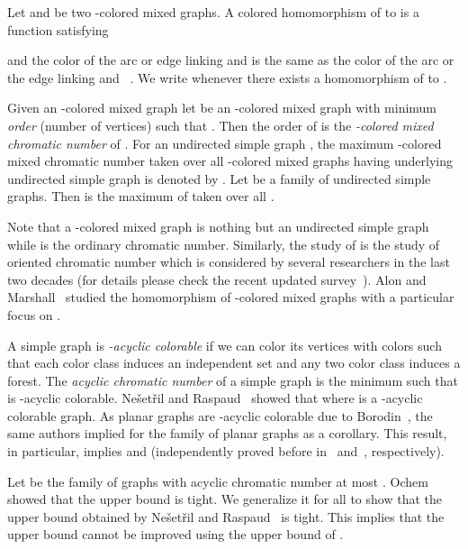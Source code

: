 \documentclass[11pt]{article}
\begin{document}
  
Let  and 
be two -colored mixed graphs. 
A colored homomorphism of  to  is a function  satisfying
 

and the color of the arc or  edge linking  and  is the same as the color of the arc or the edge linking  and ~\cite{raspaud_and_nesetril}.
  We write  whenever there exists a 
 homomorphism of  to .


Given an -colored mixed graph  let  be an -colored mixed graph with minimum \textit{order} (number of vertices) such that . 
Then the order of  is the \textit{-colored mixed chromatic number}  of .
For an undirected simple graph , the maximum -colored mixed chromatic number taken over all -colored mixed
graphs having underlying undirected simple graph  is denoted by  .
Let  be a family of undirected simple graphs. 
Then   is the maximum of  
taken over all .




Note that a -colored mixed graph   is nothing but an undirected simple graph while  
 is the ordinary chromatic number. 
Similarly, the study of  
is  the study of oriented chromatic number which is considered by several researchers in the last two decades (for details please check the recent updated survey~\cite{sopena_updated_survey}).
Alon and Marshall~\cite{Marshall-edgecoloring}  studied the homomorphism of -colored mixed graphs with a particular focus on . 

A simple graph  is \textit{-acyclic colorable} if we can color its vertices with  colors such that each color class induces an independent set and any two color class induces a forest. 
The \textit{acyclic chromatic number}  of a simple graph  is the minimum   
such that  is -acyclic colorable. 
Ne\v{s}et\v{r}il and Raspaud~\cite{raspaud_and_nesetril} showed that  where  is a -acyclic colorable graph. 
As planar graphs are -acyclic colorable due to Borodin~\cite{Borodinacyclic}, the same authors implied 
  for the family  of planar graphs as a corollary.
This result, in particular, implies  and  (independently proved 
before in~\cite{planar80} and~\cite{Marshall-edgecoloring}, respectively). 


 Let  be the family of graphs with acyclic chromatic number at most . Ochem~\cite{Ochem_negativeresults} showed that the upper bound     is tight.  
We generalize it for all  to show that the upper bound 
 obtained by Ne\v{s}et\v{r}il and Raspaud~\cite{raspaud_and_nesetril}
is tight. 
This implies that the upper bound  cannot be improved using
the upper bound of .  
\end{document}
